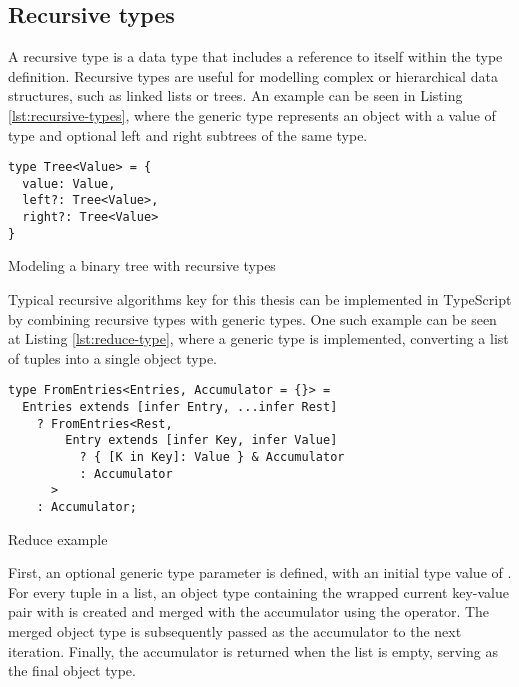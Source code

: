 \clearpage

\subsection{Recursive types}

A recursive type is a data type that includes a reference to itself within the type definition. Recursive types are useful for modelling complex or hierarchical data structures, such as linked lists or trees. An example can be seen in Listing \ref{lst:recursive-types}, where the  generic type represents an object with a value of type  and optional left and right subtrees of the same type.

\begin{listing}[ht]
  \begin{verbatim}
type Tree<Value> = {
  value: Value,
  left?: Tree<Value>,
  right?: Tree<Value>
}
\end{verbatim}
  \caption{Modeling a binary tree with recursive types}\label{lst:recursive-types}
\end{listing}

Typical recursive algorithms key for this thesis can be implemented in TypeScript by combining recursive types with generic types. One such example can be seen at Listing \ref{lst:reduce-type}, where a  generic type is implemented, converting a list of  tuples into a single object type.

\begin{listing}[ht]
  \begin{verbatim}
type FromEntries<Entries, Accumulator = {}> =
  Entries extends [infer Entry, ...infer Rest]
    ? FromEntries<Rest,
        Entry extends [infer Key, infer Value]
          ? { [K in Key]: Value } & Accumulator
          : Accumulator
      >
    : Accumulator;
\end{verbatim}
  \caption{Reduce example}\label{lst:reduce-type}
\end{listing}

First, an optional generic type parameter  is defined, with an initial type value of \vcode{{}}. For every tuple in a list, an object type containing the wrapped current key-value pair with  is created and merged with the accumulator using the \vcode{&} operator. The merged object type is subsequently passed as the accumulator to the next iteration. Finally, the accumulator is returned when the list is empty, serving as the final object type.


